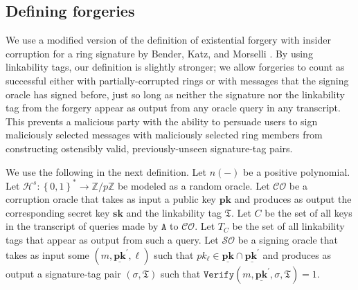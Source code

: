 \documentclass{mrl}
\theoremstyle{plain}
\theoremstyle{definition}
\begin{document}
\subsection{Defining forgeries}
We use a modified version of the definition of existential forgery with insider corruption for a ring signature by Bender, Katz, and Morselli \cite{bender}. By using linkability tags, our definition is slightly stronger; we allow forgeries to count as successful either with partially-corrupted rings or with messages that the signing oracle has signed before, just so long as neither the signature nor the linkability tag from the forgery appear as output from any oracle query in any transcript. This prevents a malicious party with the ability to persuade users to sign maliciously selected messages with maliciously selected ring members from constructing ostensibly valid, previously-unseen signature-tag pairs.

We use the following in the next definition. Let $n(-)$ be a positive polynomial. Let $\mathcal{H}^s:\left\{0,1\right\}^* \to \mathbb{Z}/p\mathbb{Z}$ be modeled as a random oracle. Let $\mathcal{CO}$ be a corruption oracle that takes as input a public key $\textbf{pk}$ and produces as output the corresponding secret key $\textbf{sk}$ and the linkability tag $\mathfrak{T}$. Let $C$ be the set of all keys in the transcript of queries made by $\texttt{A}$ to $\mathcal{CO}$. Let $T_C$ be the set of all linkability tags that appear as output from such a query. Let $\mathcal{SO}$ be a signing oracle that takes as input some $(m, \underline{\textbf{pk}}^\prime, \ell)$ such that $pk_\ell \in \underline{\textbf{pk}} \cap \underline{\textbf{pk}^\prime}$ and produces as output a signature-tag pair $(\sigma, \mathfrak{T})$ such that $\texttt{Verify}(m, \underline{\textbf{pk}}^\prime, \sigma, \mathfrak{T}) = 1$.
\end{document}
